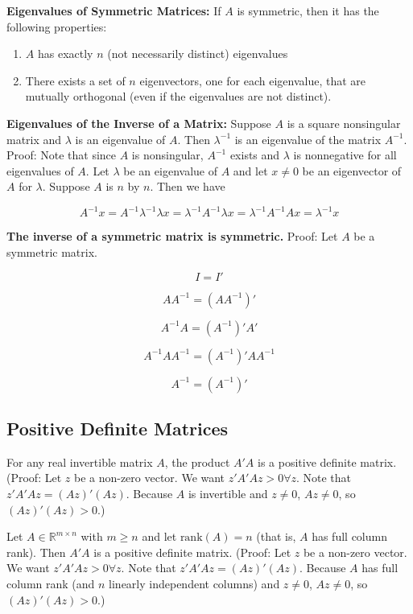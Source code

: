 \textbf{Eigenvalues of Symmetric Matrices:} If \(A\) is symmetric, then it has the following properties:

\begin{enumerate}[1.]

\item \(A\) has exactly \(n\) (not necessarily distinct) eigenvalues

\item There exists a set of \(n\) eigenvectors, one for each eigenvalue, that are mutually orthogonal (even if the eigenvalues are not distinct).

\end{enumerate}

\textbf{Eigenvalues of the Inverse of a Matrix:} Suppose \(A\) is a square nonsingular matrix and \(\lambda\) is an eigenvalue of \(A\). Then \(\lambda^{-1}\) is an eigenvalue of the matrix \(A^{-1}\). Proof: Note that since \(A\) is nonsingular, \(A^{-1}\) exists and \(\lambda\) is nonnegative for all eigenvalues of \(A\). Let \(\lambda\) be an eigenvalue of \(A\) and let \(x \neq 0\) be an eigenvector of \(A\) for \(\lambda\). Suppose \(A\) is \(n\) by \(n\). Then we have

\[
A^{-1}x = A^{-1}\lambda^{-1} \lambda x = \lambda^{-1} A^{-1} \lambda x = \lambda^{-1} A^{-1} A x = \lambda^{-1}x
\]

\textbf{The inverse of a symmetric matrix is symmetric.} Proof: Let \(A\) be a symmetric matrix.

\[
I = I'
\]

\[
A A^{-1} = (A A^{-1})'
\]

\[
A^{-1} A = (A^{-1})'A'
\]

\[
A^{-1} A A^{-1} = (A^{-1})'A A^{-1}
\]

\[
A^{-1} = (A^{-1})'
\]

\subsection{Positive Definite Matrices}

For any real invertible matrix \(A\), the product \(A' A\) is a positive definite matrix. (Proof: Let \(z\) be a non-zero vector. We want \(z' A' A z >0 \forall z\). Note that \(z' A' A z = (Az)'(Az)\). Because \(A\) is invertible and \(z \neq 0\), \(Az \neq 0 \), so \((Az)'(Az) > 0\).)

Let \(A \in \mathbb{R}^{m \times n}\) with \(m \geq n\) and let \(\text{rank}(A) = n\) (that is, \(A\) has full column rank). Then \(A' A\) is a positive definite matrix. (Proof: Let \(z\) be a non-zero vector. We want \(z' A' A z >0 \forall z\). Note that \(z' A' A z = (Az)'(Az)\). Because \(A\) has full column rank (and \(n\) linearly independent columns) and \(z \neq 0\), \(Az \neq 0 \), so \((Az)'(Az) > 0\).)

